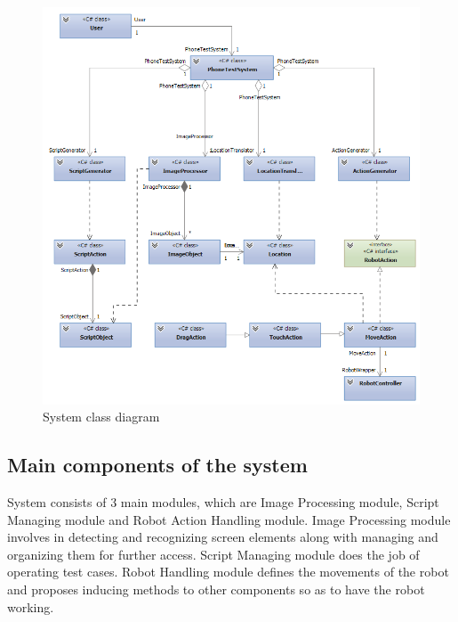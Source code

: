     \begin{figure}[H]
		\centering
		\includegraphics[scale=0.75]{Chapters/Fig/class_diagram.png}
		\caption{System class diagram}
		\label{fig:class_diagram}
	\end{figure}

\subsection{Main components of the system}
System consists of 3 main modules, which are Image Processing module, Script Managing module and Robot Action Handling module. Image Processing module involves in detecting and recognizing screen elements along with managing and organizing them for further access. Script Managing module does the job of operating test cases. Robot Handling module defines the movements of the robot and proposes inducing methods to other components so as to have the robot working.

